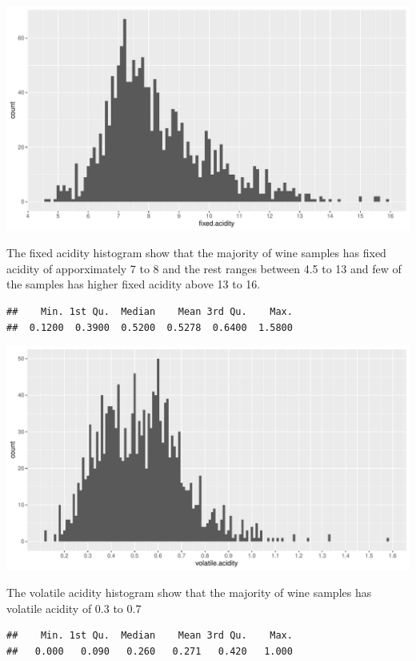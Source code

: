 \documentclass[]{article}
\begin{document}
\begin{center}\includegraphics{Figs/unnamed-chunk-1-1} \end{center}

The fixed acidity histogram show that the majority of wine samples has
fixed acidity of apporximately 7 to 8 and the rest ranges between 4.5 to
13 and few of the samples has higher fixed acidity above 13 to 16.

\begin{verbatim}
##    Min. 1st Qu.  Median    Mean 3rd Qu.    Max. 
##  0.1200  0.3900  0.5200  0.5278  0.6400  1.5800
\end{verbatim}

\begin{center}\includegraphics{Figs/unnamed-chunk-2-1} \end{center}

The volatile acidity histogram show that the majority of wine samples
has volatile acidity of 0.3 to 0.7

\begin{verbatim}
##    Min. 1st Qu.  Median    Mean 3rd Qu.    Max. 
##   0.000   0.090   0.260   0.271   0.420   1.000
\end{verbatim}
\end{document}

